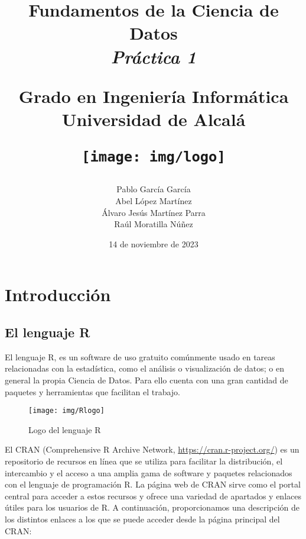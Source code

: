 \documentclass[12pt]{report}\usepackage[]{graphicx}\usepackage[dvipsnames]{xcolor}
\title{
	\huge
	\noindent\textbf{Fundamentos de la Ciencia de Datos}\\
	
	{\Large \textit{Práctica 1}}
	\vspace{1cm}
	
	\huge
	Grado en Ingeniería Informática\\
	Universidad de Alcalá\\
	
	\vspace{1cm}
	
	\texttt{[image: img/logo]}
}
\author{
	Pablo García García\\
	Abel López Martínez\\
	Álvaro Jesús Martínez Parra\\
	Raúl Moratilla Núñez
}
\date{
	\large{14 de noviembre de 2023}
}
\begin{document}
	
	\renewcommand{\chaptername}{Parte}
	\renewcommand{\lstlistingname}{Código}
	\maketitle \thispagestyle{empty}
	
	\newpage
	
	\tableofcontents
	\listoffigures
	
	\chapter*{Introducción}\pagestyle{plain}
	
		\section*{El lenguaje R}
		
			El lenguaje R, es un software de uso gratuito comúnmente usado en tareas relacionadas con la estadística, como el análisis o visualización de datos; o en general la propia Ciencia de Datos. Para ello cuenta con una gran cantidad de paquetes y herramientas que facilitan el trabajo.  
			
			\begin{figure}[H]
				\centering
				\texttt{[image: img/Rlogo]}
				\caption{Logo del lenguaje R}
				\label{fig:logo_R}
			\end{figure}
		
			El CRAN (Comprehensive R Archive Network, \url{https://cran.r-project.org/}) es un repositorio de recursos en línea que se utiliza para facilitar la distribución, el intercambio y el acceso a una amplia gama de software y paquetes relacionados con el lenguaje de programación R. La página web de CRAN sirve como el portal central para acceder a estos recursos y ofrece una variedad de apartados y enlaces útiles para los usuarios de R. A continuación, proporcionamos una descripción de los distintos enlaces a los que se puede acceder desde la página principal del CRAN: 
			
\end{document}

